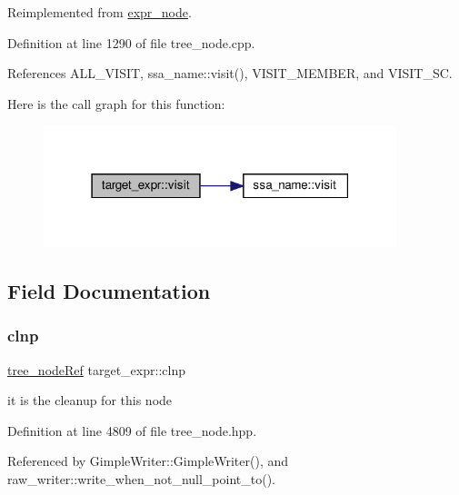 Reimplemented from \hyperlink{structexpr__node_aac767878f13ca07371dde2c3938ef38a}{expr\+\_\+node}.



Definition at line 1290 of file tree\+\_\+node.\+cpp.



References A\+L\+L\+\_\+\+V\+I\+S\+IT, ssa\+\_\+name\+::visit(), V\+I\+S\+I\+T\+\_\+\+M\+E\+M\+B\+ER, and V\+I\+S\+I\+T\+\_\+\+SC.

Here is the call graph for this function\+:
\nopagebreak
\begin{figure}[H]
\begin{center}
\leavevmode
\includegraphics[width=291pt]{d8/d6a/structtarget__expr_a69a7da18ea0d8b008cec659f2a24b63e_cgraph}
\end{center}
\end{figure}


\subsection{Field Documentation}
\mbox{\label{structtarget__expr_ac80460d67150bc8145a6469172292d12}} 
\subsubsection{\texorpdfstring{clnp}{clnp}}
{\footnotesize\ttfamily \hyperlink{tree__node_8hpp_a6ee377554d1c4871ad66a337eaa67fd5}{tree\+\_\+node\+Ref} target\+\_\+expr\+::clnp}



it is the cleanup for this node 



Definition at line 4809 of file tree\+\_\+node.\+hpp.



Referenced by Gimple\+Writer\+::\+Gimple\+Writer(), and raw\+\_\+writer\+::write\+\_\+when\+\_\+not\+\_\+null\+\_\+point\+\_\+to().

\mbox{\label{structtarget__expr_a017095d8f477d1afbc7032d381d172ef}} 
